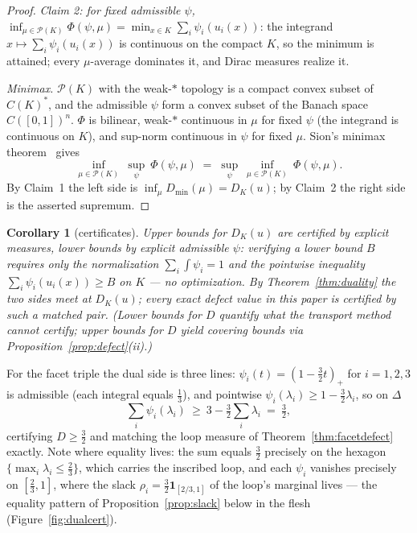 \documentclass[11pt,reqno]{amsart}
\theoremstyle{plain}
\newtheorem{corollary}[theorem]{Corollary}
\theoremstyle{definition}
\theoremstyle{remark}
\begin{document}
\begin{proof}
\emph{Claim 2: for fixed admissible $\psi$,}
$\inf_{\mu\in\mathcal P(K)}\Phi(\psi,\mu)=\min_{x\in
K}\sum_i\psi_i(u_i(x))$: the integrand $x\mapsto\sum_i\psi_i(u_i(x))$ is
continuous on the compact $K$, so the minimum is attained; every
$\mu$-average dominates it, and Dirac measures realize it.

\emph{Minimax.} $\mathcal P(K)$ with the weak-$*$ topology is a compact
convex subset of $C(K)^*$, and the admissible $\psi$ form a convex subset of
the Banach space $C([0,1])^n$. $\Phi$ is bilinear, weak-$*$ continuous in
$\mu$ for fixed $\psi$ (the integrand is continuous on $K$), and sup-norm
continuous in $\psi$ for fixed $\mu$. Sion's minimax theorem~\cite{Sion58}
gives
\[
\inf_{\mu\in\mathcal P(K)}\ \sup_{\psi}\ \Phi(\psi,\mu)\;=\;
\sup_{\psi}\ \inf_{\mu\in\mathcal P(K)}\ \Phi(\psi,\mu).
\]
By Claim~1 the left side is $\inf_\mu D_{\min}(\mu)=D_K(u)$; by Claim~2 the
right side is the asserted supremum.
\end{proof}

\begin{corollary}[certificates]\label{cor:certificates}
Upper bounds for $D_K(u)$ are certified by explicit measures, lower bounds by
explicit admissible $\psi$: verifying a lower bound $B$ requires only the
normalization $\sum_i\int\psi_i=1$ and the pointwise inequality
$\sum_i\psi_i(u_i(x))\ge B$ on $K$ --- no optimization. By
Theorem~\ref{thm:duality} the two sides meet at $D_K(u)$; every exact defect
value in this paper is certified by such a matched pair. (Lower bounds for
$D$ quantify what the transport method \emph{cannot} certify; upper bounds
for $D$ yield covering bounds via Proposition~\ref{prop:defect}(ii).)
\end{corollary}

For the facet triple the dual side is three lines:
$\psi_i(t)=(1-\tfrac32t)_+$ for $i=1,2,3$ is admissible (each integral equals
$\tfrac13$), and pointwise $\psi_i(\lambda_i)\ge1-\tfrac32\lambda_i$, so on
$\Delta$
\[
\textstyle\sum_i\psi_i(\lambda_i)\ \ge\ 3-\tfrac32\sum_i\lambda_i\ =\
\tfrac32 ,
\]
certifying $D\ge\tfrac32$ and matching the loop measure of
Theorem~\ref{thm:facetdefect} exactly. Note where equality lives: the sum
equals $\tfrac32$ precisely on the hexagon
$\{\max_i\lambda_i\le\tfrac23\}$, which carries the inscribed loop, and each
$\psi_i$ vanishes precisely on $[\tfrac23,1]$, where the slack
$\rho_i=\tfrac32\mathbf1_{[2/3,1]}$ of the loop's marginal lives --- the
equality pattern of Proposition~\ref{prop:slack} below in the flesh
(Figure~\ref{fig:dualcert}).
\end{document}
